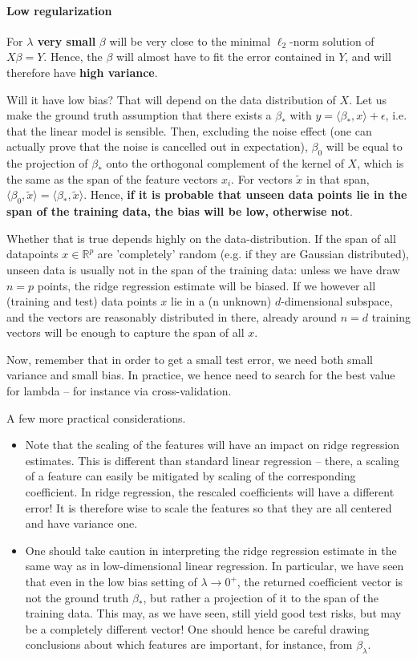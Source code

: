 \documentclass{article}
\newcommand{\sprod}[1]{\langle #1 \rangle}
\newcommand{\R}{\mathbb{R}}
\begin{document}
\paragraph{Low regularization} For \textbf{$\lambda$ very small} $\beta$ will be very close to the minimal $\ell_2$-norm solution of $X\beta = Y$. Hence, the $\beta$ will almost have to fit the error contained in $Y$, and will therefore have \textbf{high variance}. 

Will it have low bias? That will depend on the data distribution of $X$. Let us make the ground truth assumption that there exists a $\beta_*$ with $y=\sprod{\beta_*,x}+\epsilon$, i.e. that the linear model is sensible. Then, excluding the noise effect (one can actually prove that the noise is cancelled out in expectation), $\beta_0$ will be equal to the projection of $\beta_*$ onto the orthogonal complement of the kernel of $X$, which is the same as the span of the feature vectors $x_i$. For vectors $\tilde{x}$ in that span,  $\sprod{\beta_0,\tilde{x}}= \sprod{\beta_*,\tilde{x}}$. Hence, \textbf{if it is probable that unseen data points lie in the span of the training data, the bias will be low, otherwise not}. 

Whether that is true depends highly on the data-distribution. If the span of all datapoints $x \in \R^p$ are 'completely' random (e.g. if they are Gaussian distributed), unseen data is usually not in the span of the training data: unless we have draw $n=p$ points, the ridge regression estimate will be biased. If we however all (training and test) data points $x$ lie in a (n unknown) $d$-dimensional subspace, and the vectors are reasonably distributed in there, already around $n=d$ training vectors will be enough to capture the span of all $x$.



Now, remember that in order to get a small test error, we need both small variance and small bias. In practice, we hence need to search for the best value for lambda -- for instance via cross-validation. 

A few more practical considerations.
\begin{itemize}
    \item Note that the scaling of the features will have an impact on ridge regression estimates. This is different than standard linear regression -- there, a scaling of a feature can easily be mitigated by scaling of the corresponding coefficient. In ridge regression, the rescaled coefficients will have a different error! It is therefore wise to scale the features so that they are all centered and have variance one.
    \item One should take caution in interpreting the ridge regression estimate in the same way as in low-dimensional linear regression. In particular, we have seen that even in the low bias setting of $\lambda\to 0^+$, the returned coefficient vector is not the ground truth $\beta_*$, but rather a projection of it to the span of the training data. This may, as we have seen, still yield good test risks, but may be a completely different vector! One should hence be careful drawing conclusions about which features are important, for instance, from $\beta_\lambda$.
\end{itemize}
\end{document}
